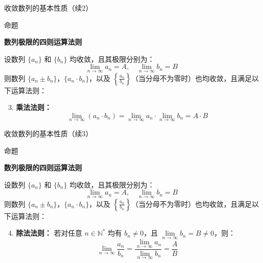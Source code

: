 \documentclass[aspectratio=169,10pt,fontset=fandol]{ctexbeamer}
\begin{document}
\begin{frame}[t,fragile]{收敛数列的基本性质（续2）}
\footnotesize
\begin{block}{命题}
{\footnotesize
\textbf{数列极限的四则运算法则}\par



设数列 $\{a_n\}$ 和 $\{b_n\}$ 均收敛，且其极限分别为：
\begin{equation*}
	\lim\limits_{n \to \infty} a_n = A, \quad \lim\limits_{n \to \infty} b_n = B
\end{equation*}
则数列 $\{a_n \pm b_n\}$，$\{a_n \cdot b_n\}$，以及 $\left\{\frac{a_n}{b_n}\right\}$（当分母不为零时）也均收敛，且满足以下运算法则：

\begin{enumerate}
	\setcounter{enumi}{2}
\item \textbf{乘法法则：}
	\begin{equation*}
		\lim_{n \to \infty} (a_n \cdot b_n) = \lim_{n \to \infty} a_n \cdot \lim_{n \to \infty} b_n = A \cdot B
	\end{equation*}
	
	
\end{enumerate}
}
\end{block}
\end{frame}
\begin{frame}[t,fragile]{收敛数列的基本性质（续3）}
\footnotesize
\begin{block}{命题}
{\footnotesize
\textbf{数列极限的四则运算法则}\par



设数列 $\{a_n\}$ 和 $\{b_n\}$ 均收敛，且其极限分别为：
\begin{equation*}
	\lim\limits_{n \to \infty} a_n = A, \quad \lim\limits_{n \to \infty} b_n = B
\end{equation*}
则数列 $\{a_n \pm b_n\}$，$\{a_n \cdot b_n\}$，以及 $\left\{\frac{a_n}{b_n}\right\}$（当分母不为零时）也均收敛，且满足以下运算法则：

\begin{enumerate}
	\setcounter{enumi}{3}
\item \textbf{除法法则：}
	若对任意 $n \in \mathbb{N}^*$ 均有 $b_n \neq 0$，且 $\lim\limits_{n \to \infty} b_n = B \neq 0$，则：
	\begin{equation*}
		\lim_{n \to \infty} \frac{a_n}{b_n} = \frac{\lim\limits_{n \to \infty} a_n}{\lim\limits_{n \to \infty} b_n} = \frac{A}{B}
	\end{equation*}
\end{enumerate}

}
\end{block}
\end{frame}
\end{document}
